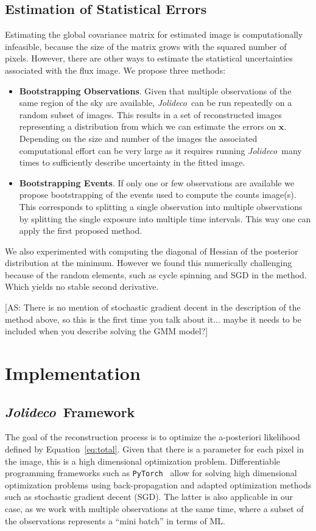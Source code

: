 \documentclass[twocolumn]{aastex631}
\newcommand{\jolideco}{\textit{Jolideco}~}
\newcommand{\as}[1]{{\color{purple} [AS: #1]}}
\begin{document}
    \subsection{Estimation of Statistical Errors}
    Estimating the global covariance matrix for estimated image is computationally infeasible, because the size of the matrix grows with the squared number of pixels. However, there are other ways to estimate the statistical uncertainties associated with the flux image. We propose three methods:

    \begin{itemize}
    \item \textbf{Bootstrapping Observations}. Given that multiple observations of the same region of the sky are available, \jolideco can be run repeatedly on a random subset of images. This results in a set of reconstructed images representing a distribution from which we can estimate the errors on $\mathbf{x}$. Depending on the size and number of the images the associated computational effort can be very large as it requires running \jolideco many times to sufficiently describe uncertainty in the fitted image.

    \item \textbf{Bootstrapping Events}. If only one or few observations are available we propose bootstrapping of the events used to compute the counts image(s). This corresponds to splitting a single observation into multiple observations by splitting the single exposure into multiple time intervals. This way one can apply the first proposed method.
    \end{itemize}

    We also experimented with computing the diagonal of Hessian of the posterior distribution at the minimum. However we found this numerically challenging because of the random elements, such as cycle spinning and SGD in the method. Which yields no stable second derivative.

\as{There is no mention of stochastic gradient decent in the description of the method above, so this is the first time you talk about it... maybe it needs to be included when you describe solving the GMM model?}

    \section{Implementation}
    \subsection{\jolideco Framework}
    The goal of the reconstruction process is to optimize the a-posteriori likelihood defined by Equation~\ref{eq:total}. Given that there is a parameter for each pixel in the image,  
    this is a high dimensional optimization problem. Differentiable programming frameworks such as \texttt{PyTorch}~\citep{Pytorch2019} allow for solving high dimensional optimization problems using back-propagation and adapted optimization methods such as stochastic gradient decent (SGD). The latter is also applicable in our case, as we work with multiple observations at the same time, where a subset of the observations represents a \enquote{mini batch} in terms of ML.
\end{document}

